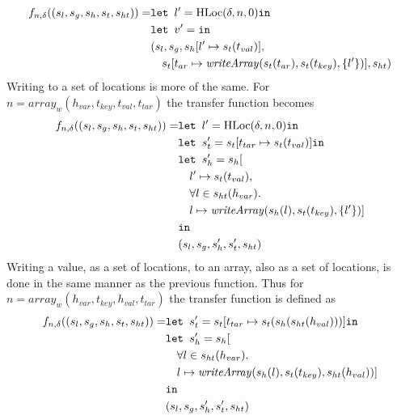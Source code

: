 \begin{align}
f_{n,\delta}((s_l, s_g, s_h, s_t, s_{ht})) = & \texttt{let } l' = \text{HLoc}(\delta, n, 0) \texttt{in }\notag\\
                            & \texttt{let } v' =  \texttt{in }\notag\\
                            &(s_l, s_g, s_h[l'\mapsto s_t(t_{val})], \notag\\
                            &\quad s_t[t_{ar} \mapsto \mathit{writeArray}(s_t(t_{ar}), s_t(t_{key}), \{l'\})], s_{ht})
\end{align}
Writing to a set of locations is more of the same. For $n = \mathit{array}_w(h_{var}, t_{key},t_{val},t_{tar})$ the transfer function becomes
\begin{align}
f_{n,\delta}((s_l, s_g, s_h, s_t, s_{ht})) = &\texttt{let } l' = \text{HLoc}(\delta, n, 0) \texttt{in } \notag\\
                            &\texttt{let } s_t' = s_t[t_{tar}\mapsto s_t(t_{val})] \texttt{in }\notag\\
                            &\texttt{let } s_h' = s_h[\notag\\
                            &\quad l' \mapsto s_t(t_{val}), \notag\\
                            &\quad \forall l \in s_{ht}(h_{var}).\notag\\
                            &\quad l\mapsto \mathit{writeArray}(s_h(l), s_t(t_{key}), \{l'\})]\notag\\
                            & \texttt{in }\notag\\
                            &(s_l, s_g, s_h', s_t', s_{ht})
\end{align}
Writing a value, as a set of locations, to an array, also as a set of locations, is done in the same manner as the previous function. Thus for  $n = \mathit{array}_w(h_{var}, t_{key},h_{val},t_{tar})$ the transfer function is defined as 
\begin{align}
    f_{n,\delta}((s_l, s_g, s_h, s_t, s_{ht})) = &\texttt{let } s_t' = s_t[t_{tar}\mapsto s_t(s_h(s_{ht}(h_{val})))] \texttt{in }\notag\\
                              &\texttt{let } s_h' = s_h[\notag\\
                              &\quad \forall l \in s_{ht}(h_{var}).\notag\\
                              &\quad l\mapsto \mathit{writeArray}(s_h(l), s_t(t_{key}), s_{ht}(h_{val}))]\notag\\
                              & \texttt{in }\notag\\
                              &(s_l, s_g, s_h', s_t', s_{ht})
\end{align}

